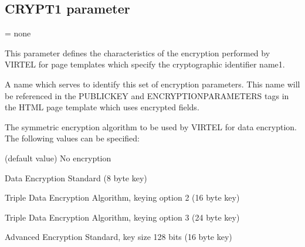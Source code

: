 \documentclass[letterpaper,10pt,english]{sphinxmanual}
\begin{document}
\ignorespaces 

\subsection{CRYPT1 parameter}
\label{\detokenize{Installation_Guide:crypt1-parameter}}\label{\detokenize{Installation_Guide:index-49}}
\begin{sphinxVerbatim}[commandchars=\\\{\}]
\PYG{p}{[}\PYG{p}{]}\PYG{p}{[}\PYG{p}{]}\PYG{p}{[}\PYG{p}{]}\PYG{p}{[}\PYG{p}{]}\PYG{p}{[}\PYG{p}{]}\PYG{p}{[}\PYG{p}{]}
\end{sphinxVerbatim}

\sphinxAtStartPar
{} = none

\sphinxAtStartPar
This parameter defines the characteristics of the encryption performed by VIRTEL for page templates which specify the cryptographic identifier name1.

\sphinxAtStartPar
{} \sphinxhyphen{} A name which serves to identify this set of encryption parameters. This name will be referenced in the PUBLIC\sphinxhyphen{}KEY and ENCRYPTION\sphinxhyphen{}PARAMETERS tags in the HTML page template which uses encrypted fields.

\sphinxAtStartPar
{} \sphinxhyphen{} The symmetric encryption algorithm to be used by VIRTEL for data encryption. The following values can be specified:

\sphinxAtStartPar
{} \sphinxhyphen{} (default value) No encryption

\sphinxAtStartPar
{} \sphinxhyphen{} Data Encryption Standard (8 byte key)

\sphinxAtStartPar
{} \sphinxhyphen{} Triple Data Encryption Algorithm, keying option 2 (16 byte key)

\sphinxAtStartPar
{} \sphinxhyphen{} Triple Data Encryption Algorithm, keying option 3 (24 byte key)

\sphinxAtStartPar
{} \sphinxhyphen{} Advanced Encryption Standard, key size 128 bits (16 byte key)
\end{document}
